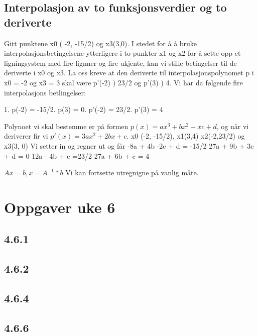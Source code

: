 \documentclass[a4paper,norsk]{article}
\begin{document}
\subsection{Interpolasjon av to funksjonsverdier og to deriverte}
Gitt punktene x0 ( -2, -15/2) og x3(3,0). I stedet for å å bruke interpolasjonsbetingelsene ytterligere i to punkter x1 og x2 
for å sette opp et ligningsystem med fire lignner og fire ukjente, kan vi stille betingelser til de deriverte i x0 og x3.
La oss kreve at den deriverte til interpolasjonspolynomet p i x0 = -2 og x3 = 3 skal være p'(-2) ) 23/2 og p'(3) ) 4.
Vi har da følgende fire interpolasjons betlingelser: \newline

1. p(-2) = -15/2. p(3) = 0. p'(-2) = 23/2. p'(3) = 4\newline

Polynoet vi skal bestemme er på formen \(p(x) = ax^3 + bx^2 + xc + d\), og når vi
deriverer fir vi \(p'(x) = 3ax^2 + 2bx + c\). x0 (-2, -15/2), x1(3,4) x2(-2,23/2) og x3(3, 0) Vi setter in og regner ut og får\newline
-8a + 4b -2c + d = -15/2\newline
27a + 9b + 3c + d = 0\newline
12a - 4b + c =23/2\newline
27a + 6b + c = 4\newline

\(Ax=b, x = A^ {-1} * b\) Vi kan fortsette utregnigne  på vanlig måte.

\section{Oppgaver uke 6}

\subsection{4.6.1}

\subsection{4.6.2}

\subsection{4.6.4}

\subsection{4.6.6}
\end{document}
